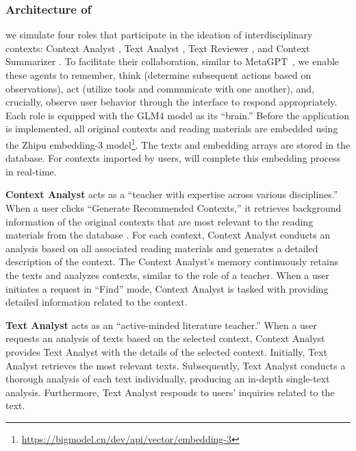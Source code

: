 \subsubsection{Architecture of \name{}}
\label{sbsbsc:architecture}
we simulate four roles  that participate in the ideation of interdisciplinary contexts: Context Analyst , Text Analyst , Text Reviewer , and Context Summarizer .
To facilitate their collaboration, similar to MetaGPT~\cite{hong2024metagpt}, we enable these agents to remember, think (\ie determine subsequent actions based on observations), act (\ie utilize tools and communicate with one another), and, crucially, observe user behavior through the interface to respond appropriately.
Each role is equipped with the GLM4 model as its ``brain.''
Before the application is implemented, all original contexts and reading materials are embedded using the Zhipu embedding-3 model\footnote{\url{https://bigmodel.cn/dev/api/vector/embedding-3}}. The texts and embedding arrays are stored in the database.
For contexts imported by users, \name{} will complete this embedding process in real-time.

\textbf{Context Analyst} acts as a ``teacher with expertise across various disciplines.'' When a user clicks ``Generate Recommended Contexts,'' it retrieves background information of the original contexts that are most relevant to the reading materials from the database
. For each context, Context Analyst conducts an analysis based on all associated reading materials and generates a detailed description of the context. The Context Analyst's memory continuously retains the texts and analyzes contexts, similar to the role of a teacher. When a user initiates a request in ``Find'' mode, Context Analyst is tasked with providing detailed information related to the context.

\textbf{Text Analyst} acts as an ``active-minded literature teacher.'' When a user requests an analysis of texts based on the selected context, Context Analyst provides Text Analyst with the details of the selected context. Initially, Text Analyst
retrieves the most relevant texts. Subsequently, Text Analyst conducts a thorough analysis of each text individually, producing an in-depth single-text analysis. Furthermore, Text Analyst responds to users' inquiries related to the text.

